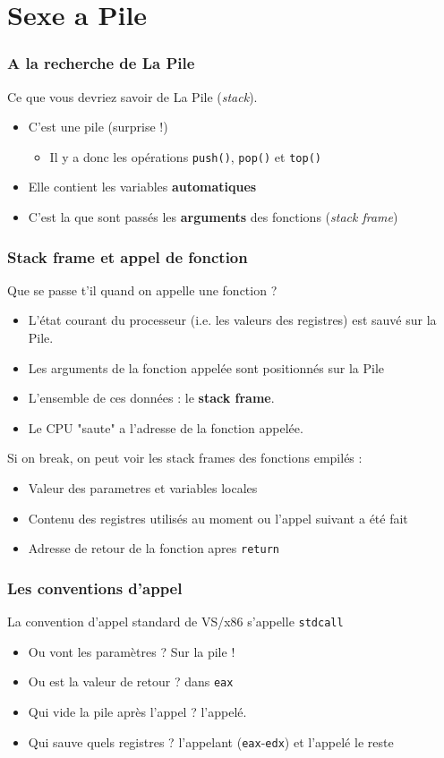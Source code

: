 \documentclass{beamer}
\begin{document}
\section{Sexe a Pile}

\begin{frame}
\frametitle{A la recherche de La Pile}
Ce que vous devriez savoir de La Pile (\textit{stack}).
\begin{itemize}
\item C'est une pile (surprise !)
        \begin{itemize}
        \item Il y a donc les opérations \texttt{push()}, \texttt{pop()} et  \texttt{top()}
        \end{itemize}
\item Elle contient les variables \textbf{automatiques} 
\item C'est la que sont passés les \textbf{arguments} des fonctions (\textit{stack frame})
\end{itemize}
\end{frame}


\begin{frame}
\frametitle{Stack frame et appel de fonction}
Que se passe t'il quand on appelle une fonction ?
\begin{itemize}
\item L'état courant du processeur (i.e. les valeurs des registres) est sauvé sur la Pile.
\item Les arguments de la fonction appelée sont positionnés sur la Pile
\item L'ensemble de ces données : le \textbf{stack frame}.
\item Le CPU "saute" a l'adresse de la fonction appelée.
\end{itemize}
Si on break, on peut voir les stack frames des fonctions empilés :
\begin{itemize}
\item Valeur des parametres et variables locales
\item Contenu des registres utilisés au moment ou l'appel suivant a été fait
\item Adresse de retour de la fonction apres \lstinline+return+
\end{itemize} 
\end{frame}

\begin{frame}
\frametitle{Les conventions d'appel} %
La convention d'appel standard de VS/x86 s'appelle \texttt{stdcall}
\begin{itemize}
\item Ou vont les paramètres ? Sur la pile !
\item Ou est la valeur de retour ? dans \texttt{eax}
\item Qui vide la pile après l'appel ? l'appelé.
\item Qui sauve quels registres ? l'appelant (\texttt{eax}-\texttt{edx}) et l'appelé le reste
\end{itemize}
\end{frame}
\end{document}
